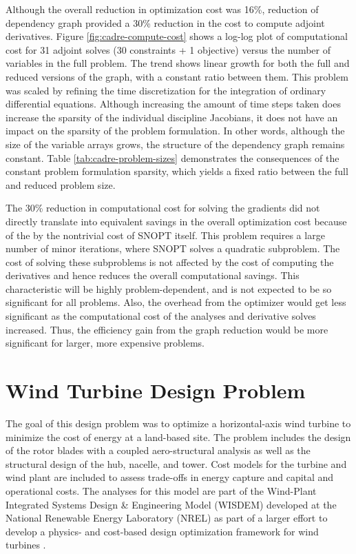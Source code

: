 \documentclass[]{aiaa-tc} %
\begin{document}
            Although the overall reduction in optimization cost was 16\%, reduction of dependency graph provided
            a 30\% reduction in the cost to compute adjoint derivatives. 
            Figure \ref{fig:cadre-compute-cost} shows a log-log plot of computational cost for 31 adjoint solves (30 constraints + 1 objective) versus the
            number of variables in the full problem. The trend shows linear growth for both the full and reduced
            versions of the graph, with a constant ratio between them. This problem was scaled by
            refining the time discretization for the integration of ordinary differential equations. Although
            increasing the amount of time steps taken does increase the sparsity of the individual discipline Jacobians,
            it does not have an impact on the sparsity of the problem formulation. In other words, although the size of the
            variable arrays grows, the structure of the dependency graph remains constant. Table \ref{tab:cadre-problem-sizes}
            demonstrates the consequences of the constant problem formulation sparsity, which yields a fixed ratio between
            the full and reduced problem size.

            The 30\% reduction in computational cost for solving the gradients did not directly translate into
            equivalent savings in the overall optimization cost because of the by the nontrivial cost of
            SNOPT itself. This problem requires a large number of minor iterations, where SNOPT solves a quadratic subproblem.
            The cost of solving these subproblems is not affected by the cost of computing the derivatives and hence
            reduces the overall computational savings. This characteristic will be highly problem-dependent, and is not expected
            to be so significant for all problems. Also, the overhead from the optimizer would get less significant as the 
            computational cost of the analyses and derivative solves increased. Thus, the efficiency gain from the graph reduction 
            would be more significant for larger, more expensive problems.


  \section{Wind Turbine Design Problem}

    The goal of this design problem was to optimize a horizontal-axis wind turbine to minimize
    the cost of energy at a land-based site. The problem includes the design of the rotor blades
    with a coupled aero-structural analysis as well as the structural design of the hub, nacelle,
    and tower.  Cost models for the turbine and wind plant are included
    to assess trade-offs in energy capture and capital and operational costs.  The analyses
    for this model are part of the Wind-Plant Integrated Systems Design \& Engineering Model (WISDEM)
    developed at the National Renewable Energy Laboratory (NREL) as part of a larger effort
    to develop a physics- and cost-based design optimization framework for wind turbines  \cite{Dykes2014a,Ning2013a,Ning2014,Ning2014d}.
\end{document}
